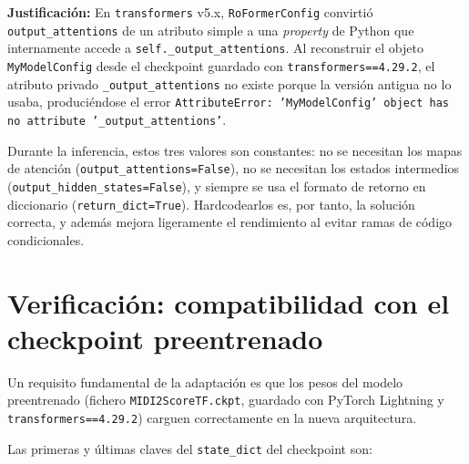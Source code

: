 \documentclass[12pt,a4paper]{article}
\begin{document}
\begin{notebox}
\textbf{Justificación:} En \texttt{transformers} v5.x, \texttt{RoFormerConfig}
convirtió \texttt{output\_attentions} de un atributo simple a una \textit{property}
de Python que internamente accede a \texttt{self.\_output\_attentions}. Al reconstruir
el objeto \texttt{MyModelConfig} desde el checkpoint guardado con
\texttt{transformers==4.29.2}, el atributo privado \texttt{\_output\_attentions} no
existe porque la versión antigua no lo usaba, produciéndose el error
\texttt{AttributeError: 'MyModelConfig' object has no attribute '\_output\_attentions'}.

Durante la inferencia, estos tres valores son constantes: no se necesitan los mapas de
atención (\texttt{output\_attentions=False}), no se necesitan los estados intermedios
(\texttt{output\_hidden\_states=False}), y siempre se usa el formato de retorno en
diccionario (\texttt{return\_dict=True}). Hardcodearlos es, por tanto, la solución
correcta, y además mejora ligeramente el rendimiento al evitar ramas de código
condicionales.
\end{notebox}

\section{Verificación: compatibilidad con el checkpoint preentrenado}

Un requisito fundamental de la adaptación es que los pesos del modelo preentrenado
(fichero \texttt{MIDI2ScoreTF.ckpt}, guardado con PyTorch Lightning y
\texttt{transformers==4.29.2}) carguen correctamente en la nueva arquitectura.

Las primeras y últimas claves del \texttt{state\_dict} del checkpoint son:
\end{document}
